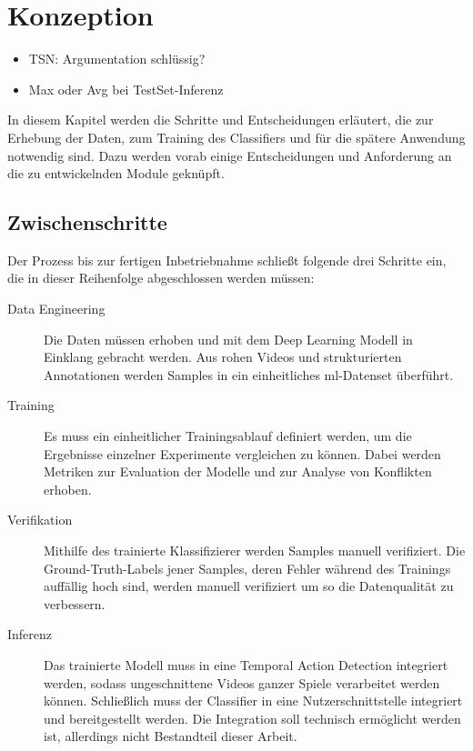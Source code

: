 \chapter{Konzeption}
\label{ch:concept}

\begin{tcolorbox}[title=Todo]
    \begin{itemize}
        \item TSN: Argumentation schlüssig?
        \item Max oder Avg bei TestSet-Inferenz
    \end{itemize}
\end{tcolorbox}

In diesem Kapitel werden die Schritte und Entscheidungen erläutert, die zur Erhebung der Daten, zum Training des Classifiers und für die spätere Anwendung notwendig sind.
Dazu werden vorab einige Entscheidungen und Anforderung an die zu entwickelnden Module geknüpft.

\section{Zwischenschritte}
\label{sec:steps}

Der Prozess bis zur fertigen Inbetriebnahme schließt folgende drei Schritte ein, die in dieser Reihenfolge abgeschlossen werden müssen:

\begin{description}
    \item[Data Engineering] Die Daten müssen erhoben und mit dem Deep Learning Modell in Einklang gebracht werden.
    Aus rohen Videos und strukturierten Annotationen werden Samples in ein einheitliches \gls{ml}-Datenset überführt.
    \item[Training] Es muss ein einheitlicher Trainingsablauf definiert werden, um die Ergebnisse einzelner Experimente vergleichen zu können.
    Dabei werden Metriken zur Evaluation der Modelle und zur Analyse von Konflikten erhoben.
    \item[Verifikation] Mithilfe des trainierte Klassifizierer werden Samples manuell verifiziert.
    Die Ground-Truth-Labels jener Samples, deren Fehler während des Trainings auffällig hoch sind, werden manuell verifiziert um so die Datenqualität zu verbessern.
    \item[Inferenz] Das trainierte Modell muss in eine Temporal Action Detection integriert werden, sodass ungeschnittene Videos ganzer Spiele verarbeitet werden können.
    Schließlich muss der Classifier in eine Nutzerschnittstelle integriert und bereitgestellt werden.
    Die Integration soll technisch ermöglicht werden ist, allerdings nicht Bestandteil dieser Arbeit.
\end{description}

